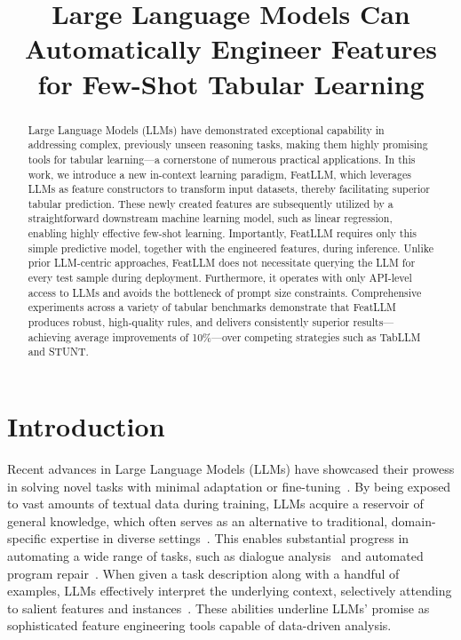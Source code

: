 \title{Large Language Models Can Automatically Engineer Features for Few-Shot Tabular Learning}

\begin{abstract}
Large Language Models (LLMs) have demonstrated exceptional capability in addressing complex, previously unseen reasoning tasks, making them highly promising tools for tabular learning—a cornerstone of numerous practical applications. In this work, we introduce a new in-context learning paradigm, \textsf{FeatLLM}, which leverages LLMs as feature constructors to transform input datasets, thereby facilitating superior tabular prediction. These newly created features are subsequently utilized by a straightforward downstream machine learning model, such as linear regression, enabling highly effective few-shot learning. Importantly, \textsf{FeatLLM} requires only this simple predictive model, together with the engineered features, during inference. Unlike prior LLM-centric approaches, \textsf{FeatLLM} does not necessitate querying the LLM for every test sample during deployment. Furthermore, it operates with only API-level access to LLMs and avoids the bottleneck of prompt size constraints. Comprehensive experiments across a variety of tabular benchmarks demonstrate that \textsf{FeatLLM} produces robust, high-quality rules, and delivers consistently superior results—achieving average improvements of 10\%—over competing strategies such as TabLLM and STUNT.
\end{abstract}

\section{Introduction}
Recent advances in Large Language Models (LLMs) have showcased their prowess in solving novel tasks with minimal adaptation or fine-tuning~\cite{creswell2022selection,imani2023mathprompter,taylor2022galactica}. By being exposed to vast amounts of textual data during training, LLMs acquire a reservoir of general knowledge, which often serves as an alternative to traditional, domain-specific expertise in diverse settings~\cite{Genomes2021,singhal2023large,wilcox2003role}. This enables substantial progress in automating a wide range of tasks, such as dialogue analysis~\cite{finch2023leveraging} and automated program repair~\cite{fan2023automated}. When given a task description along with a handful of examples, LLMs effectively interpret the underlying context, selectively attending to salient features and instances~\cite{brown2020language,zhao2023survey}. These abilities underline LLMs' promise as sophisticated feature engineering tools capable of data-driven analysis.

